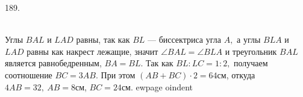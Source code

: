 189. \begin{figure}[ht!]
\end{figure}\\
Углы $BAL$ и $LAD$ равны, так как $BL$ --- биссектриса угла $A,$ а углы $BLA$ и $LAD$ равны как накрест лежащие, значит $\angle BAL=\angle BLA$ и треугольник $BAL$ является равнобедренным, $BA=BL.$ Так как $BL:LC=1:2,$ получаем соотношение $BC=3AB.$ При этом $(AB+BC)\cdot2=64$см, откуда $4AB=32,\ AB=8$см, $BC=24$см.
ewpage
oindent

